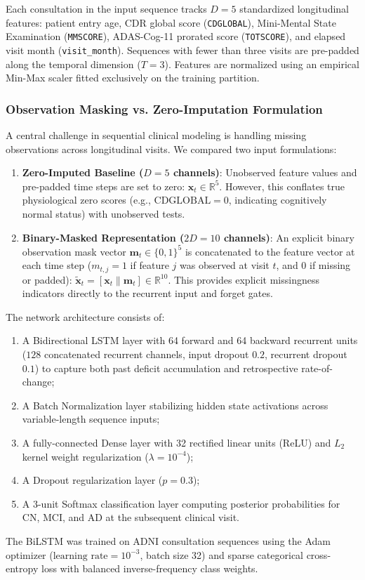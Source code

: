 Each consultation in the input sequence tracks $D = 5$ standardized longitudinal features: patient entry age, CDR global score (\texttt{CDGLOBAL}), Mini-Mental State Examination (\texttt{MMSCORE}), ADAS-Cog-11 prorated score (\texttt{TOTSCORE}), and elapsed visit month (\texttt{visit\_month}). Sequences with fewer than three visits are pre-padded along the temporal dimension ($T=3$). Features are normalized using an empirical Min-Max scaler fitted exclusively on the training partition.

\subsubsection{Observation Masking vs. Zero-Imputation Formulation}
A central challenge in sequential clinical modeling is handling missing observations across longitudinal visits. We compared two input formulations:
\begin{enumerate}
    \item \textbf{Zero-Imputed Baseline ($D = 5$ channels)}: Unobserved feature values and pre-padded time steps are set to zero: $\mathbf{x}_t \in \mathbb{R}^5$. However, this conflates true physiological zero scores (e.g., $\text{CDGLOBAL} = 0$, indicating cognitively normal status) with unobserved tests.
    \item \textbf{Binary-Masked Representation ($2D = 10$ channels)}: An explicit binary observation mask vector $\mathbf{m}_t \in \{0, 1\}^5$ is concatenated to the feature vector at each time step ($m_{t, j} = 1$ if feature $j$ was observed at visit $t$, and $0$ if missing or padded): $\tilde{\mathbf{x}}_t = [\mathbf{x}_t \parallel \mathbf{m}_t] \in \mathbb{R}^{10}$. This provides explicit missingness indicators directly to the recurrent input and forget gates.
\end{enumerate}

The network architecture consists of:
\begin{enumerate}
    \item A Bidirectional LSTM layer with 64 forward and 64 backward recurrent units ($128$ concatenated recurrent channels, input dropout $0.2$, recurrent dropout $0.1$) to capture both past deficit accumulation and retrospective rate-of-change;
    \item A Batch Normalization layer stabilizing hidden state activations across variable-length sequence inputs;
    \item A fully-connected Dense layer with 32 rectified linear units (ReLU) and $L_2$ kernel weight regularization ($\lambda = 10^{-4}$);
    \item A Dropout regularization layer ($p = 0.3$);
    \item A 3-unit Softmax classification layer computing posterior probabilities for CN, MCI, and AD at the subsequent clinical visit.
\end{enumerate}
The BiLSTM was trained on ADNI consultation sequences using the Adam optimizer ($\text{learning rate} = 10^{-3}$, batch size 32) and sparse categorical cross-entropy loss with balanced inverse-frequency class weights.

